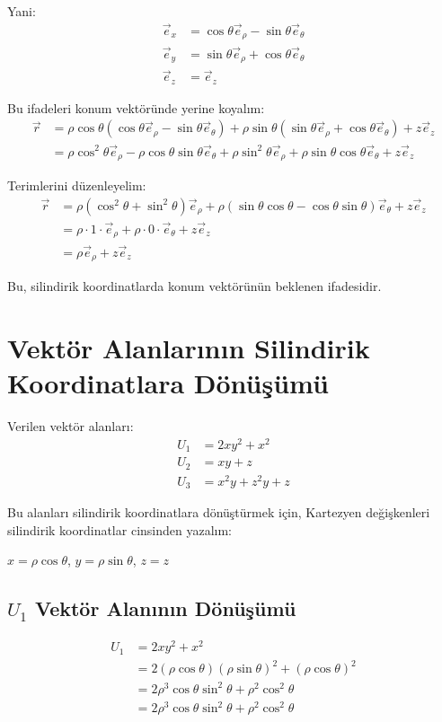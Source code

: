 \documentclass[11pt,letterpaper,twocolumn]{fenbil}
\begin{document}
Yani:
\begin{align}
    \vec{e}_x &= \cos\theta\vec{e}_\rho - \sin\theta\vec{e}_\theta \\
    \vec{e}_y &= \sin\theta\vec{e}_\rho + \cos\theta\vec{e}_\theta \\
    \vec{e}_z &= \vec{e}_z
\end{align}

Bu ifadeleri konum vektöründe yerine koyalım:
\begin{align}
    \vec{r} &= \rho\cos\theta(\cos\theta\vec{e}_\rho - \sin\theta\vec{e}_\theta) + \rho\sin\theta(\sin\theta\vec{e}_\rho + \cos\theta\vec{e}_\theta) + z\vec{e}_z \\
    &= \rho\cos^2\theta\vec{e}_\rho - \rho\cos\theta\sin\theta\vec{e}_\theta + \rho\sin^2\theta\vec{e}_\rho + \rho\sin\theta\cos\theta\vec{e}_\theta + z\vec{e}_z
\end{align}

Terimlerini düzenleyelim:
\begin{align}
    \vec{r} &= \rho(\cos^2\theta + \sin^2\theta)\vec{e}_\rho + \rho(\sin\theta\cos\theta - \cos\theta\sin\theta)\vec{e}_\theta + z\vec{e}_z \\
    &= \rho \cdot 1 \cdot \vec{e}_\rho + \rho \cdot 0 \cdot \vec{e}_\theta + z\vec{e}_z \\
    &= \rho\vec{e}_\rho + z\vec{e}_z
\end{align}

Bu, silindirik koordinatlarda konum vektörünün beklenen ifadesidir.

\section*{Vektör Alanlarının Silindirik Koordinatlara Dönüşümü}

Verilen vektör alanları:
\begin{align}
    U_1 &= 2xy^2 + x^2 \\
    U_2 &= xy + z \\
    U_3 &= x^2y + z^2y + z
\end{align}

Bu alanları silindirik koordinatlara dönüştürmek için, Kartezyen değişkenleri silindirik koordinatlar cinsinden yazalım:

$x = \rho\cos\theta$, $y = \rho\sin\theta$, $z = z$

\subsection*{$U_1$ Vektör Alanının Dönüşümü}
\begin{align}
    U_1 &= 2xy^2 + x^2 \\
    &= 2(\rho\cos\theta)(\rho\sin\theta)^2 + (\rho\cos\theta)^2 \\
    &= 2\rho^3\cos\theta\sin^2\theta + \rho^2\cos^2\theta \\
    &= 2\rho^3\cos\theta\sin^2\theta + \rho^2\cos^2\theta
\end{align}
\end{document}
